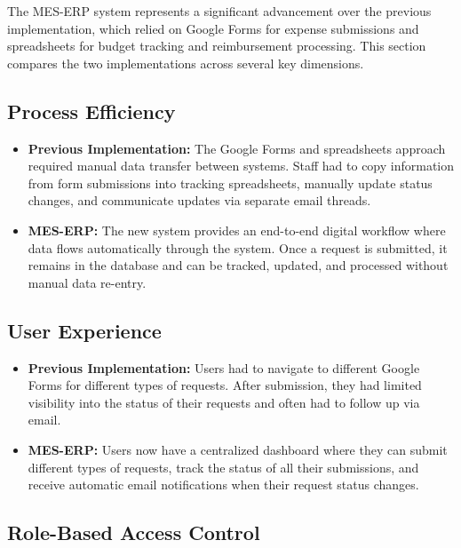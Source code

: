 \documentclass[12pt, titlepage]{article}
\begin{document}
The MES-ERP system represents a significant advancement over the previous implementation, which relied on Google Forms for expense submissions and spreadsheets for budget tracking and reimbursement processing. This section compares the two implementations across several key dimensions.

\subsection{Process Efficiency}

\begin{itemize}
    \item \textbf{Previous Implementation:} The Google Forms and spreadsheets approach required manual data transfer between systems. Staff had to copy information from form submissions into tracking spreadsheets, manually update status changes, and communicate updates via separate email threads.
    
    \item \textbf{MES-ERP:} The new system provides an end-to-end digital workflow where data flows automatically through the system. Once a request is submitted, it remains in the database and can be tracked, updated, and processed without manual data re-entry.
\end{itemize}

\subsection{User Experience}

\begin{itemize}
    \item \textbf{Previous Implementation:} Users had to navigate to different Google Forms for different types of requests. After submission, they had limited visibility into the status of their requests and often had to follow up via email.
    
    \item \textbf{MES-ERP:} Users now have a centralized dashboard where they can submit different types of requests, track the status of all their submissions, and receive automatic email notifications when their request status changes.
\end{itemize}

\subsection{Role-Based Access Control}
\end{document}
